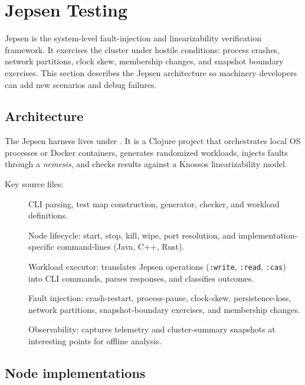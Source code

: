 \section{Jepsen Testing}
\label{sec:JepsenTesting}

Jepsen is the system-level fault-injection and linearizability verification
framework. It exercises the cluster under hostile conditions: process crashes,
network partitions, clock skew, membership changes, and snapshot boundary
exercises. This section describes the Jepsen architecture so machinery
developers can add new scenarios and debug failures.

\subsection{Architecture}

The Jepsen harness lives under . It is a Clojure project
that orchestrates local OS processes or Docker containers, generates
randomized workloads, injects faults through a \emph{nemesis}, and checks
results against a Knossos linearizability model.

Key source files:

\begin{description}
\item[] CLI parsing, test map construction,
generator, checker, and workload definitions.
\item[] Node lifecycle: start, stop, kill, wipe,
port resolution, and implementation-specific command-lines (Java, C++, Rust).
\item[] Workload executor: translates Jepsen
operations (\texttt{:write}, \texttt{:read}, \texttt{:cas}) into CLI commands,
parses responses, and classifies outcomes.
\item[] Fault injection: crash-restart,
process-pause, clock-skew, persistence-loss, network partitions, snapshot-boundary
exercises, and membership changes.
\item[] Observability: captures telemetry
and cluster-summary snapshots at interesting points for offline analysis.
\end{description}

\subsection{Node implementations}

